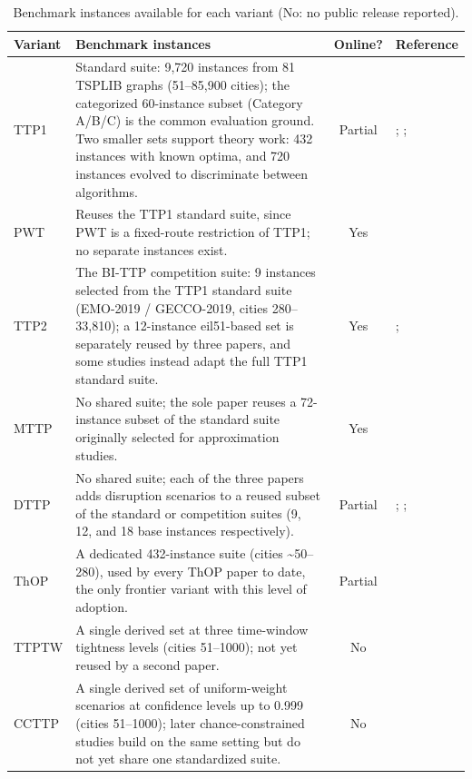 \begin{table}[htbp]
\centering
\footnotesize
\caption{Benchmark instances available for each variant (No: no public release reported).}
\label{tab:benchmarks}
\setlength{\tabcolsep}{4pt}
\begin{threeparttable}
\begin{tabular}{@{}lp{10.0cm}cp{3.5cm}@{}}
\toprule
\textbf{Variant} & \textbf{Benchmark instances} & \textbf{Online?} & \textbf{Reference} \\
\midrule
TTP1 & Standard suite: 9,720 instances from 81 TSPLIB graphs (51--85,900 cities); the categorized 60-instance subset (Category A/B/C) is the common evaluation ground. Two smaller sets support theory work: 432 instances with known optima, and 720 instances evolved to discriminate between algorithms. & Partial\tnote{a} & \citet{polyakovskiy2014comprehensive}; \citet{wu2017exact}; \citet{bossek2021generating} \\
PWT & Reuses the TTP1 standard suite, since PWT is a fixed-route restriction of TTP1; no separate instances exist. & Yes\tnote{c} & \citet{polyakovskiy2014comprehensive} \\
TTP2 & The BI-TTP competition suite: 9 instances selected from the TTP1 standard suite (EMO-2019 / GECCO-2019, cities 280--33{,}810); a 12-instance eil51-based set is separately reused by three papers, and some studies instead adapt the full TTP1 standard suite. & Yes\tnote{c} & \citet{polyakovskiy2014comprehensive}; \citet{chagas2021non} \\
MTTP & No shared suite; the sole paper reuses a 72-instance subset of the standard suite originally selected for approximation studies. & Yes\tnote{c} & \citet{chand2016fast} \\
DTTP & No shared suite; each of the three papers adds disruption scenarios to a reused subset of the standard or competition suites (9, 12, and 18 base instances respectively). & Partial\tnote{b} & \citet{sachdeva2020dynamic}; \citet{herring2020dynamic}; \citet{herring2020responsive} \\
ThOP & A dedicated 432-instance suite (cities \textasciitilde{}50--280), used by every ThOP paper to date, the only frontier variant with this level of adoption. & Partial\tnote{d} & \citet{santos2018thief} \\
TTPTW & A single derived set at three time-window tightness levels (cities 51--1000); not yet reused by a second paper. & No & \citet{angmalisang2026traveling} \\
CCTTP & A single derived set of uniform-weight scenarios at confidence levels up to 0.999 (cities 51--1000); later chance-constrained studies build on the same setting but do not yet share one standardized suite. & No & \citet{pathirage2024chance} \\

\end{tabular}
\end{threeparttable}
\end{table}
